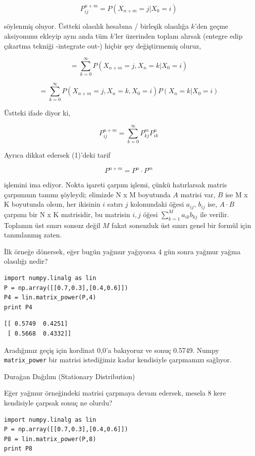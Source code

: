 \documentclass[12pt,fleqn]{article}\usepackage{../../common}
\begin{document}
$$
P_{ij}^{n+m} = P(X_{n+m} = j | X_0 = i )
$$

söylenmiş oluyor. Üstteki olasılık hesabına / birleşik olasılığa $k$'den geçme
aksiyonunu ekleyip aynı anda tüm $k$'ler üzerinden toplam alırsak (entegre edip
çıkartma tekniği -integrate out-) hiçbir şey değiştirmemiş oluruz,

$$
= \sum_{k=0}^{\infty} P(X_{n+m} = j, X_n = k | X_0 = i )
$$

$$
= \sum_{k=0}^{\infty} P(X_{n+m} = j, X_n = k, X_0 = i )
P(X_n=k|X_0=i)
$$

Üstteki ifade diyor ki,

$$
P_{ij}^{n+m} = \sum _{k=0}^{\infty} P_{kj}^m P_{ik}^n 
$$

Ayrıca dikkat edersek (1)'deki tarif

$$
P^{n+m} = P^n \cdot P^m
$$

işlemini ima ediyor. Nokta işareti çarpım işlemi, çünkü hatırlarsak matris
çarpımının tanımı şöyleydi; elimizde N x M boyutunda $A$ matrisi var, $B$ ise M
x K boyutunda olsun, her ikisinin $i$ satırı $j$ kolonundaki öğesi $a_{ij}$,
$b_{ij}$ ise, $A \cdot B$ çarpımı bir N x K matrisidir, bu matrisin $i,j$ öğesi
$\sum_{k=1}^{M} a_{ik}b_{kj}$ ile verilir. Toplamın üst sınırı sonsuz değil
$M$ fakat sonsuzluk üst sınırı genel bir formül için tanımlanmış zaten.


İlk örneğe dönersek, eğer bugün yağmur yağıyorsa 4 gün sonra yağmur yağma
olasılığı nedir?

\begin{verbatim}
import numpy.linalg as lin
P = np.array([[0.7,0.3],[0.4,0.6]])
P4 = lin.matrix_power(P,4)
print P4
\end{verbatim}

\begin{verbatim}
[[ 0.5749  0.4251]
 [ 0.5668  0.4332]]
\end{verbatim}

Aradığımız geçiş için kordinat 0,0'a bakıyoruz ve sonuç 0.5749. Numpy
\verb!matrix_power! bir matrisi istediğimiz kadar kendisiyle çarpmamızı
sağlıyor. 

Durağan Dağılım (Stationary Distribution)

Eğer yağmur örneğindeki matrisi çarpmaya devam edersek, mesela 8 kere
kendisiyle çarpsak sonuç ne olurdu? 

\begin{verbatim}
import numpy.linalg as lin
P = np.array([[0.7,0.3],[0.4,0.6]])
P8 = lin.matrix_power(P,8)
print P8
\end{verbatim}
\end{document}
